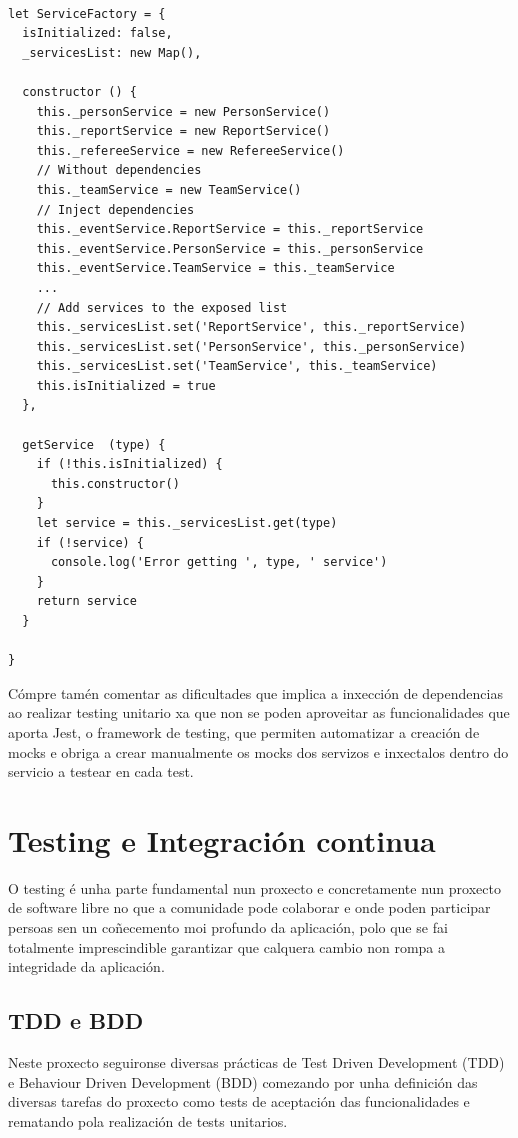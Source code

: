        \begin{lstlisting}[frame=single, caption=Exemplo de internacionalización 
na label de 
un botón.]

let ServiceFactory = {
  isInitialized: false,
  _servicesList: new Map(),

  constructor () {
    this._personService = new PersonService()
    this._reportService = new ReportService()
    this._refereeService = new RefereeService()
    // Without dependencies
    this._teamService = new TeamService()
    // Inject dependencies
    this._eventService.ReportService = this._reportService
    this._eventService.PersonService = this._personService
    this._eventService.TeamService = this._teamService
    ...
    // Add services to the exposed list
    this._servicesList.set('ReportService', this._reportService)
    this._servicesList.set('PersonService', this._personService)
    this._servicesList.set('TeamService', this._teamService)
    this.isInitialized = true
  },

  getService  (type) {
    if (!this.isInitialized) {
      this.constructor()
    }
    let service = this._servicesList.get(type)
    if (!service) {
      console.log('Error getting ', type, ' service')
    }
    return service
  }

}
    \end{lstlisting}

  Cómpre tamén comentar as dificultades que implica a inxección de dependencias 
ao realizar testing unitario xa que non se poden aproveitar as funcionalidades 
que aporta Jest, o framework de testing, que permiten automatizar a creación de 
mocks e obriga a crear manualmente os mocks dos servizos e inxectalos dentro do 
servicio a testear en cada test.

  \section{Testing e Integración continua}
  O testing é unha parte fundamental nun proxecto e concretamente nun proxecto 
de software libre no que a comunidade pode colaborar e onde poden 
participar persoas sen un coñecemento moi profundo da aplicación, polo que se 
fai totalmente imprescindible garantizar que calquera cambio non rompa a 
integridade da aplicación.

    \subsection{TDD e BDD}
  Neste proxecto seguironse diversas prácticas de Test Driven Development 
(TDD) e Behaviour Driven Development (BDD) comezando por unha definición das 
diversas tarefas do proxecto como tests de aceptación das funcionalidades e 
rematando pola realización de tests unitarios.

